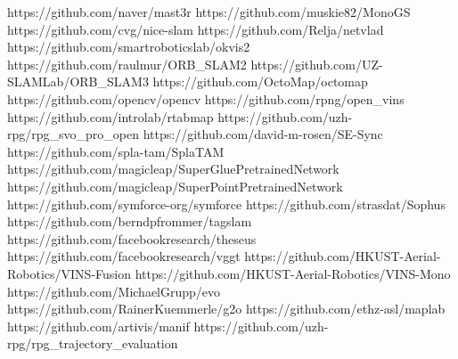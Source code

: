 \expandafter\def\csname repourl@MASt3R\endcsname{https://github.com/naver/mast3r}
\expandafter\def\csname repourl@MonoGS\endcsname{https://github.com/muskie82/MonoGS}
\expandafter\def\csname repourl@NICE-SLAM\endcsname{https://github.com/cvg/nice-slam}
\expandafter\def\csname repourl@NetVLAD\endcsname{https://github.com/Relja/netvlad}
\expandafter\def\csname repourl@OKVIS2\endcsname{https://github.com/smartroboticslab/okvis2}
\expandafter\def\csname repourl@ORB-SLAM2\endcsname{https://github.com/raulmur/ORB_SLAM2}
\expandafter\def\csname repourl@ORB-SLAM3\endcsname{https://github.com/UZ-SLAMLab/ORB_SLAM3}
\expandafter\def\csname repourl@OctoMap\endcsname{https://github.com/OctoMap/octomap}
\expandafter\def\csname repourl@OpenCV\endcsname{https://github.com/opencv/opencv}
\expandafter\def\csname repourl@OpenVINS\endcsname{https://github.com/rpng/open_vins}
\expandafter\def\csname repourl@RTAB-Map\endcsname{https://github.com/introlab/rtabmap}
\expandafter\def\csname repourl@SVO-Pro\endcsname{https://github.com/uzh-rpg/rpg_svo_pro_open}
\expandafter\def\csname repourl@SE-Sync\endcsname{https://github.com/david-m-rosen/SE-Sync}
\expandafter\def\csname repourl@SplaTAM\endcsname{https://github.com/spla-tam/SplaTAM}
\expandafter\def\csname repourl@SuperGlue\endcsname{https://github.com/magicleap/SuperGluePretrainedNetwork}
\expandafter\def\csname repourl@SuperPoint\endcsname{https://github.com/magicleap/SuperPointPretrainedNetwork}
\expandafter\def\csname repourl@SymForce\endcsname{https://github.com/symforce-org/symforce}
\expandafter\def\csname repourl@Sophus\endcsname{https://github.com/strasdat/Sophus}
\expandafter\def\csname repourl@TagSLAM\endcsname{https://github.com/berndpfrommer/tagslam}
\expandafter\def\csname repourl@Theseus\endcsname{https://github.com/facebookresearch/theseus}
\expandafter\def\csname repourl@VGGT\endcsname{https://github.com/facebookresearch/vggt}
\expandafter\def\csname repourl@VINS-Fusion\endcsname{https://github.com/HKUST-Aerial-Robotics/VINS-Fusion}
\expandafter\def\csname repourl@VINS-Mono\endcsname{https://github.com/HKUST-Aerial-Robotics/VINS-Mono}
\expandafter\def\csname repourl@evo\endcsname{https://github.com/MichaelGrupp/evo}
\expandafter\def\csname repourl@g2o\endcsname{https://github.com/RainerKuemmerle/g2o}
\expandafter\def\csname repourl@maplab\endcsname{https://github.com/ethz-asl/maplab}
\expandafter\def\csname repourl@manif\endcsname{https://github.com/artivis/manif}
\expandafter\def\csname repourl@rpg_trajectory_evaluation\endcsname{https://github.com/uzh-rpg/rpg_trajectory_evaluation}
\makeatletter
\newcommand{\repo}[2][]{%
  \IfSubStr{#2}{/}%
    {\href{https://github.com/#2}{\texttt{\color{steel}#2}}}%
    {\ifx\relax#1\relax
       \StrSubstitute{#2}{\_}{_}[\reponame]%
       \@ifundefined{repourl@\reponame}%
         {\texttt{#2}}%
         {\href{\csname repourl@\reponame\endcsname}{\texttt{\color{steel}#2}}}%
     \else \href{#1}{\texttt{\color{steel}#2}}\fi}}
